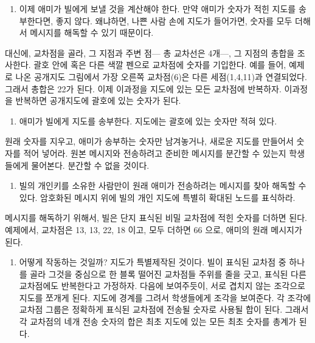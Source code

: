\documentclass[]{article}
\begin{document}
\begin{enumerate}
\itemsep1pt\parskip0pt
\item
  이제 애미가 빌에게 보낼 것을 계산해야 한다. 만약 애미가 숫자가 적힌
  지도를 송부한다면, 좋지 않다. 왜냐하면, 나쁜 사람 손에 지도가
  들어가면, 숫자를 모두 더해서 메시지를 해독할 수 있기 때문이다.
\end{enumerate}

대신에, 교차점을 골라, 그 지점과 주변 점--- 총 교차선은 4개---, 그
지점의 총합을 조사한다. 괄호 안에 혹은 다른 색깔 펜으로 교차점에 숫자를
기입한다. 예를 들어, 예제로 나온 공개지도 그림에서 가장 오른쪽
교차점(6)은 다른 세점(1,4,11)과 연결되었다. 그래서 총합은 22가 된다.
이제 이과정을 지도에 있는 모든 교차점에 반복하자. 이과정을 반복하면
공개지도에 괄호에 있는 숫자가 된다.

\begin{enumerate}
\itemsep1pt\parskip0pt
\item
  애미가 빌에게 지도를 송부한다. 지도에는 괄호에 있는 숫자만 적혀 있다.
\end{enumerate}

원래 숫자를 지우고, 애미가 송부하는 숫자만 남겨놓거나, 새로운 지도를
만들어서 숫자를 적어 넣어라. 원본 메시지와 전송하려고 준비한 메시지를
분간할 수 있는지 학생들에게 물어본다. 분간할 수 없을 것이다.

\begin{enumerate}
\itemsep1pt\parskip0pt
\item
  빌의 개인키를 소유한 사람만이 원래 애미가 전송하려는 메시지를 찾아
  해독할 수 있다. 암호화된 메시지 위에 빌의 개인 지도에 특별히 확대된
  노드를 표식하라.
\end{enumerate}

메시지를 해독하기 위해서, 빌은 단지 표식된 비밀 교차점에 적힌 숫자를
더하면 된다. 예제에서, 교차점은 13, 13, 22, 18 이고, 모두 더하면 66
으로, 애미의 원래 메시지가 된다.

\begin{enumerate}
\itemsep1pt\parskip0pt
\item
  어떻게 작동하는 것일까? 지도가 특별제작된 것이다. 빌이 표식된 교차점
  중 하나를 골라 그것을 중심으로 한 블록 떨어진 교차점들 주위를 줄을
  긋고, 표식된 다른 교차점에도 반복한다고 가정하자. 다음에 보여주듯이,
  서로 겹치지 않는 조각으로 지도를 쪼개게 된다. 지도에 경계를 그려서
  학생들에게 조각을 보여준다. 각 조각에 교차점 그룹은 정확하게 표식된
  교차점에 전송될 숫자로 사용될 합이 된다. 그래서 각 교차점의 네개 전송
  숫자의 합은 최초 지도에 있는 모든 최초 숫자를 총계가 된다.
\end{enumerate}
\end{document}

